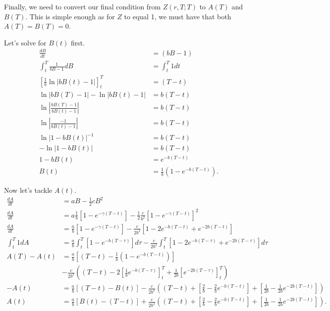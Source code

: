 \documentclass[11pt]{article}
\begin{document}
Finally, we need to convert our final condition from $Z(r,T;T)$ to $A(T)$ and $B(T)$. This is simple enough as for $Z$ to equal 1, we must have that both $A(T) = B(T) = 0$.

Let's solve for $B(t)$ first.
\begin{align}
\frac{dB}{dt} &= (bB - 1) \\[10pt]
\int_{t}^{T} \frac{1}{bB - 1} dB &= \int_{t}^{T} 1 dt \\[10pt]
\left[ \frac{1}{b} \ln |b B(t) - 1| \right]_{t}^{T} &= (T-t) \\[10pt]
\ln | b B(T) - 1 | - \ln | b B(t) - 1 | &= b(T-t) \\[10pt]
\ln \left| \frac{ b B(T) - 1}{b B(t) - 1}\right| &= b (T-t) \\[10pt]
\ln \left| \frac{ -1 }{b B(t) - 1}\right| &= b (T-t) \\[10pt]
\ln | 1 - b B(t) |^{-1} &= b (T-t) \\[10pt]
-\ln | 1 - b B(t) | &= b (T-t) \\[10pt]
1 - b B(t) &= e^{-b (T-t)} \\[10pt]
B(t) &= \frac{1}{b} (1 - e^{-b (T-t)}).
\end{align}

\newpage

Now let's tackle $A(t)$.
\begin{align}
    \frac{dA}{dt} &= a B - \frac{1}{2} c B^2\\[10pt]
    \frac{dA}{dt} &= a \frac{1}{b} \left[ 1 - e^{-\gamma(T-t)} \right] - \frac{1}{2} \frac{c}{b^2} \left[ 1 - e^{-\gamma(T-t)} \right]^2 \\[10pt]
    \frac{dA}{dt} &= \frac{a}{b} \left[ 1 - e^{-\gamma(T-t)} \right] - \frac{c}{2 b^2} \left[ 1 - 2e^{-b(T-t)} + e^{-2 b (T-t)} \right] \\[10pt]
    \int_{t}^{T} 1 dA &= \frac{a}{b} \int_{t}^{T} \left[ 1 - e^{-b(T-\tau)} \right] d\tau - \frac{c}{2b^2} \int_{t}^{T} \left[ 1 - 2e^{-b (T-\tau)} + e^{-2 b (T-\tau)} \right] d\tau \\[10pt]
    A(T) - A(t) &= \frac{a}{b}\left[ (T-t) - \frac{1}{b}\left( 1 - e^{-b(T-t)}\right) \right] \\ & - \frac{c}{2b^2} \left( (T-t)  -2 \left[ \frac{1}{b} e^{-b (T-\tau)} \right]_{t}^{T} + \frac{1}{2b} \left[ e^{-2b (T-\tau)} \right]_{t}^{T} \right) \\[10pt]
    -A(t) &= \frac{a}{b}\left[ (T-t) - B(t) \right] - \frac{c}{2b^2} \left( (T-t) + \left[ \frac{2}{b} - \frac{2}{b} e^{-b(T-t)} \right] + \left[  \frac{1}{2b} - \frac{1}{2b} e^{-2b (T-t)} \right] \right) \\[10pt]
    A(t) &=  \frac{a}{b}\left[ B(t) - (T-t) \right] + \frac{c}{2b^2} \left( (T-t) + \left[ \frac{2}{b} - \frac{2}{b} e^{-b(T-t)} \right] + \left[  \frac{1}{2b} - \frac{1}{2b} e^{-2b (T-t)} \right] \right).
\end{align}
\end{document}
